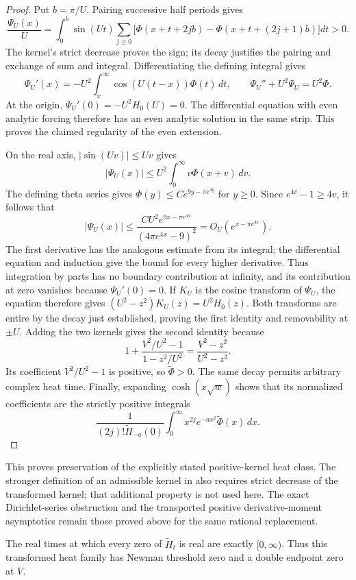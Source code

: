 \begin{proof}
Put \(b=\pi/U\). Pairing successive half periods gives
\[
 \frac{\Psi_U(x)}U
 =\int_0^b\sin(Ut)\sum_{j\ge0}
  \bigl[\Phi(x+t+2jb)-\Phi(x+t+(2j+1)b)\bigr]dt>0.
\]
The kernel's strict decrease proves the sign; its decay justifies
the pairing and exchange of sum and integral.
Differentiating the defining integral gives
\[
 \Psi_U'(x)=-U^2\int_x^\infty\cos(U(t-x))\Phi(t)\,dt,
 \qquad
 \Psi_U''+U^2\Psi_U=U^2\Phi.
\]
At the origin, \(\Psi_U'(0)=-U^2H_0(U)=0\).
The differential equation with even analytic forcing therefore
has an even analytic solution in the same strip. This proves the
claimed regularity of the even extension.

On the real axis, \(|\sin(Uv)|\le Uv\) gives
\[
 |\Psi_U(x)|\le U^2\int_0^\infty v\Phi(x+v)\,dv.
\]
The defining theta series gives
\(\Phi(y)\le C e^{9y-\pi e^{4y}}\) for \(y\ge0\).
Since \(e^{4v}-1\ge4v\), it follows that
\[
 |\Psi_U(x)|\le
 \frac{CU^2 e^{9x-\pi e^{4x}}}{(4\pi e^{4x}-9)^2}
       =O_U(e^{x-\pi e^{4x}}).
\]
The first derivative has the analogous estimate from its integral;
the differential equation and induction give the bound for every
higher derivative. Thus integration by parts has no boundary
contribution at infinity, and its contribution at zero vanishes
because \(\Psi_U'(0)=0\).
If \(K_U\) is the cosine transform of \(\Psi_U\), the equation
therefore gives
\((U^2-z^2)K_U(z)=U^2H_0(z)\).
Both transforms are entire by the decay just established, proving
the first identity and removability at \(\pm U\).
Adding the two kernels gives the second identity because
\[
 1+\frac{V^2/U^2-1}{1-z^2/U^2}
       =\frac{V^2-z^2}{U^2-z^2}.
\]
Its coefficient \(V^2/U^2-1\) is positive, so
\(\widetilde\Phi>0\). The same decay permits arbitrary complex
heat time. Finally, expanding \(\cosh(x\sqrt w)\) shows that its
normalized coefficients are the strictly positive integrals
\[
 \frac{1}{(2j)!\widetilde H_{-a}(0)}
   \int_0^\infty x^{2j}e^{-a x^2}\widetilde\Phi(x)\,dx.
\]
\end{proof}

This proves preservation of the explicitly stated positive-kernel
heat class. The stronger definition of an admissible kernel in
\cite[Definition~1.2, p.~2]{Csordas2015} also requires strict decrease
of the transformed kernel; that additional property is not used here.
The exact Dirichlet-series obstruction and the transported positive
derivative-moment asymptotics remain those proved above for the same
rational replacement.

\begin{proposition}
\label{prop:fd-surgery-threshold}
The real times at which every zero of \(\widetilde H_t\) is real
are exactly \([0,\infty)\). Thus this transformed heat family has
Newman threshold zero and a double endpoint zero at \(V\).
\end{proposition}

